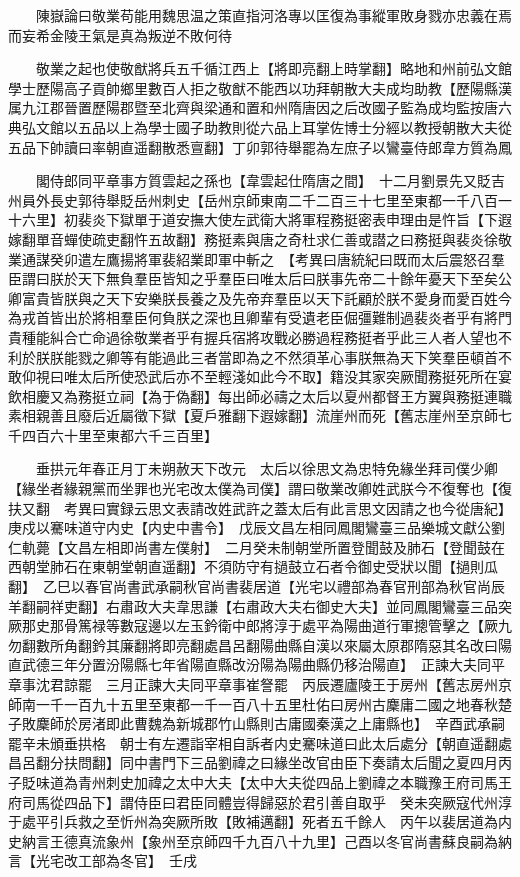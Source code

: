 　　陳嶽論曰敬業苟能用魏思温之策直指河洛專以匡復為事縱軍敗身戮亦忠義在焉而妄希金陵王氣是真為叛逆不敗何待

　　敬業之起也使敬猷將兵五千循江西上【將即亮翻上時掌翻】略地和州前弘文館學士歷陽高子貢帥鄉里數百人拒之敬猷不能西以功拜朝散大夫成均助教【歷陽縣漢属九江郡晉置歷陽郡暨至北齊與梁通和置和州隋唐因之后改國子監為成均監按唐六典弘文館以五品以上為學士國子助教則從六品上耳掌佐博士分經以教授朝散大夫從五品下帥讀曰率朝直遥翻散悉亶翻】丁卯郭待舉罷為左庶子以鸞臺侍郎韋方質為鳳

　　閣侍郎同平章事方質雲起之孫也【韋雲起仕隋唐之間】　十二月劉景先又貶吉州員外長史郭待舉貶岳州刺史【岳州京師東南二千二百三十七里至東都一千八百一十六里】初裴炎下獄單于道安撫大使左武衛大將軍程務挺密表申理由是忤旨【下遐嫁翻單音蟬使疏吏翻忤五故翻】務挺素與唐之奇杜求仁善或譛之曰務挺與裴炎徐敬業通謀癸卯遣左鷹揚將軍裴紹業即軍中斬之　【考異曰唐統紀曰既而太后震怒召羣臣謂曰朕於天下無負羣臣皆知之乎羣臣曰唯太后曰朕事先帝二十餘年憂天下至矣公卿富貴皆朕與之天下安樂朕長養之及先帝弃羣臣以天下託顧於朕不愛身而愛百姓今為戎首皆出於將相羣臣何負朕之深也且卿輩有受遺老臣倔彊難制過裴炎者乎有將門貴種能糾合亡命過徐敬業者乎有握兵宿將攻戰必勝過程務挺者乎此三人者人望也不利於朕朕能戮之卿等有能過此三者當即為之不然須革心事朕無為天下笑羣臣頓首不敢仰視曰唯太后所使恐武后亦不至輕淺如此今不取】籍没其家突厥聞務挺死所在宴飲相慶又為務挺立祠【為于偽翻】每出師必禱之太后以夏州都督王方翼與務挺連職素相親善且廢后近屬徵下獄【夏戶雅翻下遐嫁翻】流崖州而死【舊志崖州至京師七千四百六十里至東都六千三百里】

　　垂拱元年春正月丁未朔赦天下改元　太后以徐思文為忠特免緣坐拜司僕少卿【緣坐者緣親黨而坐罪也光宅改太僕為司僕】謂曰敬業改卿姓武朕今不復奪也【復扶又翻　考異曰實録云思文表請改姓武許之蓋太后有此言思文因請之也今從唐紀】　庚戍以騫味道守内史【内史中書令】　戊辰文昌左相同鳳閣鸞臺三品樂城文獻公劉仁軌薨【文昌左相即尚書左僕射】　二月癸未制朝堂所置登聞鼓及肺石【登聞鼓在西朝堂肺石在東朝堂朝直遥翻】不須防守有撾鼓立石者令御史受狀以聞【撾則瓜翻】　乙巳以春官尚書武承嗣秋官尚書裴居道【光宅以禮部為春官刑部為秋官尚辰羊翻嗣祥吏翻】右肅政大夫韋思謙【右肅政大夫右御史大夫】並同鳳閣鸞臺三品突厥那史那骨篤禄等數寇邊以左玉鈐衛中郎將淳于處平為陽曲道行軍摠管擊之【厥九勿翻數所角翻鈐其廉翻將即亮翻處昌呂翻陽曲縣自漢以來屬太原郡隋惡其名改曰陽直武德三年分置汾陽縣七年省陽直縣改汾陽為陽曲縣仍移治陽直】　正諫大夫同平章事沈君諒罷　三月正諫大夫同平章事崔詧罷　丙辰遷廬陵王于房州【舊志房州京師南一千一百九十五里至東都一千一百八十五里杜佑曰房州古麇庸二國之地春秋楚子敗麇師於房渚即此曹魏為新城郡竹山縣則古庸國秦漢之上庸縣也】　辛酉武承嗣罷辛未頒垂拱格　朝士有左遷詣宰相自訴者内史騫味道曰此太后處分【朝直遥翻處昌呂翻分扶問翻】同中書門下三品劉禕之曰緣坐改官由臣下奏請太后聞之夏四月丙子貶味道為青州刺史加禕之太中大夫【太中大夫從四品上劉禕之本職豫王府司馬王府司馬從四品下】謂侍臣曰君臣同體豈得歸惡於君引善自取乎　癸未突厥寇代州淳于處平引兵救之至忻州為突厥所敗【敗補邁翻】死者五千餘人　丙午以裴居道為内史納言王德真流象州【象州至京師四千九百八十九里】己酉以冬官尚書蘇良嗣為納言【光宅改工部為冬官】　壬戌

